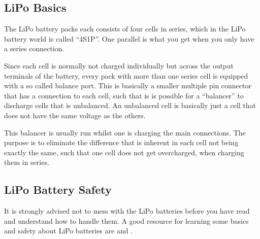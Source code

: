 \subsection{LiPo Basics}
The LiPo battery packs each consists of four cells in series, which in
the LiPo battery world is called ``4S1P''. One parallel is what you get
when you only have a series connection.

Since each cell is normally not charged individually but across the
output terminals of the battery, every pack with more than one series
cell is equipped with a so called balance port. This is basically a
smaller multiple pin connector that has a connection to each cell,
such that is is possible for a ``balancer'' to discharge cells that is
unbalanced. An unbalanced cell is basically just a cell that does not
have the same voltage as the others.

This balancer is usually run whilst one is charging the main
connections. The purpose is to eliminate the difference that is
inherent in each cell not being exactly the same, such that one cell
does not get overcharged, when charging them in series.

\subsection{LiPo Battery Safety}
\begin{tcolorbox}[colback=yellow!75!,colframe=red]
It is strongly advised not to mess with the LiPo batteries before you
have read and understand how to handle them. A good resource for
learning some basics and safety about LiPo batteries are
\citep{tjintech:lipo-basics} and \citep{tjintech:lipo-safety}.
\end{tcolorbox}
 
